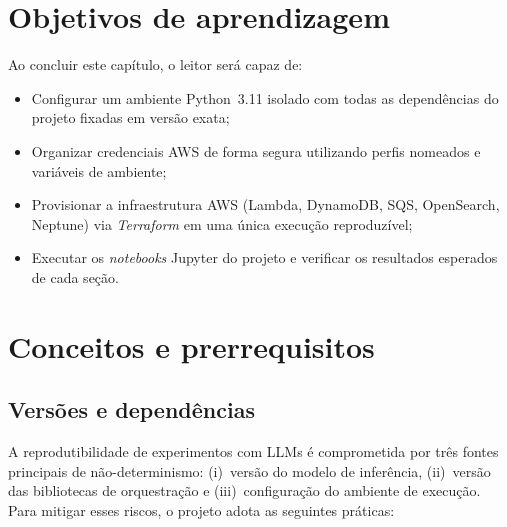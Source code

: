 \section{Objetivos de aprendizagem}

Ao concluir este cap\'itulo, o leitor ser\'a capaz de:

\begin{itemize}[leftmargin=*]
  \item Configurar um ambiente Python~3.11 isolado com todas as
        depend\^encias do projeto fixadas em vers\~ao exata;
  \item Organizar credenciais AWS de forma segura utilizando perfis
        nomeados e vari\'aveis de ambiente;
  \item Provisionar a infraestrutura AWS (Lambda, DynamoDB, SQS,
        OpenSearch, Neptune) via \textit{Terraform} em uma \'unica
        execu\c{c}\~ao reproduz\'ivel;
  \item Executar os \textit{notebooks} Jupyter do projeto e verificar
        os resultados esperados de cada se\c{c}\~ao.
\end{itemize}

\section{Conceitos e prerrequisitos}

\subsection{Vers\~oes e depend\^encias}

A reprodutibilidade de experimentos com LLMs \'e comprometida por tr\^es
fontes principais de n\~ao-determinismo: (i)~vers\~ao do modelo de
infer\^encia, (ii)~vers\~ao das bibliotecas de orquestra\c{c}\~ao e
(iii)~configura\c{c}\~ao do ambiente de execu\c{c}\~ao. Para mitigar esses
riscos, o projeto adota as seguintes pr\'aticas:

